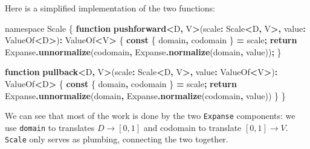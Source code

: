 \documentclass[
]{book}
\newenvironment{Shaded}{\begin{snugshade}}{\end{snugshade}}
\newcommand{\ControlFlowTok}[1]{\textcolor[rgb]{0.13,0.29,0.53}{\textbf{#1}}}
\newcommand{\DataTypeTok}[1]{\textcolor[rgb]{0.13,0.29,0.53}{#1}}
\newcommand{\FunctionTok}[1]{\textcolor[rgb]{0.13,0.29,0.53}{\textbf{#1}}}
\newcommand{\ImportTok}[1]{#1}
\newcommand{\KeywordTok}[1]{\textcolor[rgb]{0.13,0.29,0.53}{\textbf{#1}}}
\newcommand{\NormalTok}[1]{#1}
\newcommand{\OperatorTok}[1]{\textcolor[rgb]{0.81,0.36,0.00}{\textbf{#1}}}
\theoremstyle{definition}
\theoremstyle{definition}
\theoremstyle{definition}
\theoremstyle{definition}
\theoremstyle{remark}
\begin{document}
Here is a simplified implementation of the two functions:

\begin{Shaded}
\begin{Highlighting}[]
\ImportTok{namespace} \DataTypeTok{Scale}\NormalTok{ \{}
  \KeywordTok{function} \FunctionTok{pushforward}\OperatorTok{\textless{}}\NormalTok{D}\OperatorTok{,}\NormalTok{ V}\OperatorTok{\textgreater{}}\NormalTok{(scale}\OperatorTok{:}\NormalTok{ Scale}\OperatorTok{\textless{}}\NormalTok{D}\OperatorTok{,}\NormalTok{ V}\OperatorTok{\textgreater{},}\NormalTok{ value}\OperatorTok{:}\NormalTok{ ValueOf}\OperatorTok{\textless{}}\NormalTok{D}\OperatorTok{\textgreater{}}\NormalTok{)}\OperatorTok{:}\NormalTok{ ValueOf}\OperatorTok{\textless{}}\NormalTok{V}\OperatorTok{\textgreater{}}\NormalTok{ \{}
    \KeywordTok{const}\NormalTok{ \{ domain}\OperatorTok{,}\NormalTok{ codomain \} }\OperatorTok{=}\NormalTok{ scale}\OperatorTok{;}
    \ControlFlowTok{return}\NormalTok{ Expanse}\OperatorTok{.}\FunctionTok{unnormalize}\NormalTok{(codomain}\OperatorTok{,}\NormalTok{ Expanse}\OperatorTok{.}\FunctionTok{normalize}\NormalTok{(domain}\OperatorTok{,}\NormalTok{ value))}\OperatorTok{;}
\NormalTok{  \}}

  \KeywordTok{function} \FunctionTok{pullback}\OperatorTok{\textless{}}\NormalTok{D}\OperatorTok{,}\NormalTok{ V}\OperatorTok{\textgreater{}}\NormalTok{(scale}\OperatorTok{:}\NormalTok{ Scale}\OperatorTok{\textless{}}\NormalTok{D}\OperatorTok{,}\NormalTok{ V}\OperatorTok{\textgreater{},}\NormalTok{ value}\OperatorTok{:}\NormalTok{ ValueOf}\OperatorTok{\textless{}}\NormalTok{V}\OperatorTok{\textgreater{}}\NormalTok{)}\OperatorTok{:}\NormalTok{ ValueOf}\OperatorTok{\textless{}}\NormalTok{D}\OperatorTok{\textgreater{}}\NormalTok{ \{}
    \KeywordTok{const}\NormalTok{ \{ domain}\OperatorTok{,}\NormalTok{ codomain \} }\OperatorTok{=}\NormalTok{ scale}\OperatorTok{;}
    \ControlFlowTok{return}\NormalTok{ Expanse}\OperatorTok{.}\FunctionTok{unnormalize}\NormalTok{(domain}\OperatorTok{,}\NormalTok{ Expanse}\OperatorTok{.}\FunctionTok{normalize}\NormalTok{(codomain}\OperatorTok{,}\NormalTok{ value))}
\NormalTok{  \}}
\NormalTok{\}}
\end{Highlighting}
\end{Shaded}

We can see that most of the work is done by the two \texttt{Expanse} components: we use \texttt{domain} to translates \(D \to [0, 1]\) and codomain to translate \([0, 1] \to V\). \texttt{Scale} only serves as plumbing, connecting the two together.
\end{document}
